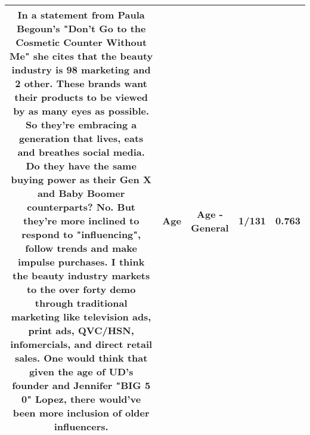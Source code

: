 \documentclass[11pt]{article}
\newlength\mylength
\begin{document}
\begin{center}
\begin{longtable}{|C{.65\mylength}|C{.30\mylength}|C{.12\mylength}|C{.12\mylength}|C{.12\mylength}|}
  \small In a statement from Paula Begoun's "Don't Go to the Cosmetic Counter Without Me" she cites that the beauty industry is 98 marketing and 2 other. These brands want their products to be viewed by as many eyes as possible. So they're embracing a generation that lives, eats and breathes social media. Do they have the same buying power as their Gen X and Baby Boomer counterparts? No. But they're more inclined to respond to "influencing", follow trends and make impulse purchases. I think the beauty industry markets to the over forty demo through traditional marketing like television ads, print ads, QVC/HSN, infomercials, and direct retail sales. One would think that given the \textbf{age} of UD's founder and Jennifer "BIG 5 0" Lopez, there would've been more inclusion of older influencers.\normalsize   & Age & Age - General & 1/131 & 0.763 \\  \hline

\end{longtable}
\end{center}
\end{document}
